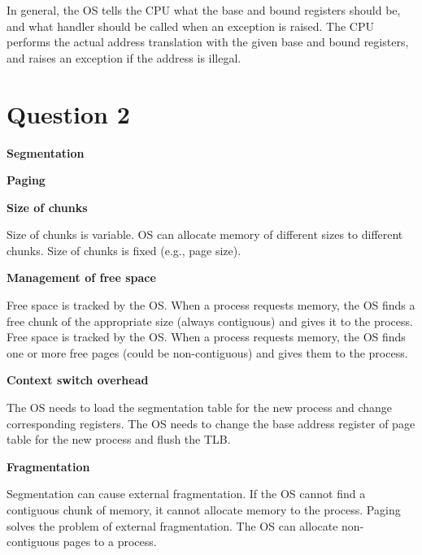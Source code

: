 \documentclass[a4paper,12pt]{article}
\begin{document}
In general, the OS tells the CPU what the base and bound registers should be, and what handler should be called when an exception is raised. The CPU performs the actual address translation with the given base and bound registers, and raises an exception if the address is illegal.

\section*{Question 2}

\begin{paracol}{2}
\begin{center}
	\textbf{Segmentation}
\end{center}
\switchcolumn
\begin{center}
	\textbf{Paging}
\end{center}
\end{paracol}

\textbf{Size of chunks}

\begin{paracol}{2}
Size of chunks is variable. OS can allocate memory of different sizes to different chunks.
\switchcolumn
Size of chunks is fixed (e.g., page size).
\end{paracol}

\textbf{Management of free space}

\begin{paracol}{2}
Free space is tracked by the OS. When a process requests memory, the OS finds a free chunk of the appropriate size (always contiguous) and gives it to the process.
\switchcolumn
Free space is tracked by the OS. When a process requests memory, the OS finds one or more free pages (could be non-contiguous) and gives them to the process.
\end{paracol}

\textbf{Context switch overhead}
\begin{paracol}{2}
The OS needs to load the segmentation table for the new process and change corresponding registers. 
\switchcolumn
The OS needs to change the base address register of page table for the new process and flush the TLB.
\end{paracol}

\textbf{Fragmentation}
\begin{paracol}{2}
Segmentation can cause external fragmentation. If the OS cannot find a contiguous chunk of memory, it cannot allocate memory to the process.
\switchcolumn
Paging solves the problem of external fragmentation. The OS can allocate non-contiguous pages to a process.
\end{paracol}
\end{document}
